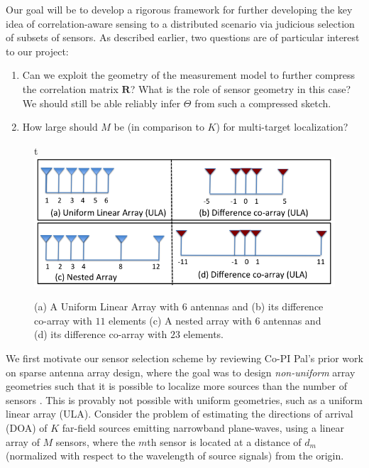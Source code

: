 Our goal will be to develop a rigorous framework for further developing the key idea of correlation-aware sensing to a distributed scenario via judicious selection of subsets of sensors. As described earlier, two questions are of particular interest to our project:
\begin{enumerate}
\item Can we exploit the geometry of the measurement model to further compress the  correlation matrix $\mathbf{R}$? What is the role of sensor geometry in this case? We should still be able reliably infer $\Theta$ from such a compressed sketch.
\item How large should $M$ be (in comparison to $K$) for multi-target localization?
\end{enumerate}
\begin{figure}{t}
\centering
\includegraphics[width=0.5\columnwidth]{figs/FigNested.png}
\caption{\label{fig:Nested}  (a) A Uniform Linear Array with $6$ antennas and (b) its difference co-array with $11$ elements (c) A nested array with $6$ antennas and (d) its difference co-array with $23$ elements.}
\end{figure}
We first motivate our sensor selection scheme by reviewing Co-PI Pal's prior work on sparse antenna array design, where the goal was to design {\em non-uniform} array geometries such that it is possible to localize more sources than the number of sensors \cite{PiyaNested,PiyaNested2D,PiyaCoprime,PalPushing}. 
This is provably not possible with uniform geometries, such as a uniform linear array (ULA). Consider the problem of estimating the directions of arrival (DOA) of $K$ far-field sources emitting narrowband plane-waves, using a linear array of $M$ sensors, where the $m$th sensor is located at a distance of $d_m$ (normalized with respect to the wavelength of source signals) from the origin. 
